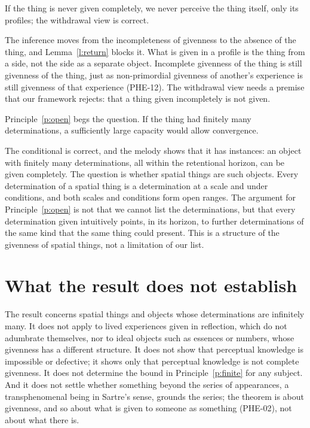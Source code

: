 \documentclass{situationist-preprint}
\begin{document}
\begin{objection}[Scepticism]
If the thing is never given completely, we never perceive the thing itself, only its profiles; the withdrawal view is correct.
\end{objection}

\begin{reply}
The inference moves from the incompleteness of givenness to the absence of the thing, and Lemma~\ref{l:return} blocks it. What is given in a profile is the thing from a side, not the side as a separate object. Incomplete givenness of the thing is still givenness of the thing, just as non-primordial givenness of another's experience is still givenness of that experience (PHE-12). The withdrawal view needs a premise that our framework rejects: that a thing given incompletely is not given.
\end{reply}

\begin{objection}
Principle~\ref{p:open} begs the question. If the thing had finitely many determinations, a sufficiently large capacity would allow convergence.
\end{objection}

\begin{reply}
The conditional is correct, and the melody shows that it has instances: an object with finitely many determinations, all within the retentional horizon, can be given completely. The question is whether spatial things are such objects. Every determination of a spatial thing is a determination at a scale and under conditions, and both scales and conditions form open ranges. The argument for Principle~\ref{p:open} is not that we cannot list the determinations, but that every determination given intuitively points, in its horizon, to further determinations of the same kind that the same thing could present. This is a structure of the givenness of spatial things, not a limitation of our list.
\end{reply}

\section{What the result does not establish}

The result concerns spatial things and objects whose determinations are infinitely many. It does not apply to lived experiences given in reflection, which do not adumbrate themselves, nor to ideal objects such as essences or numbers, whose givenness has a different structure. It does not show that perceptual knowledge is impossible or defective; it shows only that perceptual knowledge is not complete givenness. It does not determine the bound in Principle~\ref{p:finite} for any subject. And it does not settle whether something beyond the series of appearances, a transphenomenal being in Sartre's sense, grounds the series; the theorem is about givenness, and so about what is given to someone as something (PHE-02), not about what there is.
\end{document}
